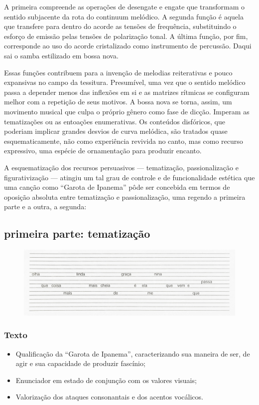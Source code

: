 A primeira compreende as operações de desengate e engate que transformam
o sentido subjacente da rota do continuum melódico. A segunda função é
aquela que transfere para dentro do acorde as tensões de frequência,
substituindo o esforço de emissão pelas tensões de polarização tonal. A
última função, por fim, corresponde ao uso do acorde cristalizado como
instrumento de percussão. Daqui sai o samba estilizado em bossa nova.

Essas funções contribuem para a invenção de melodias reiterativas e
pouco expansivas no campo da tessitura. Presumível, uma vez que o
sentido melódico passa a depender menos das inflexões em si e as
matrizes rítmicas se configuram melhor com a repetição de seus motivos.
A bossa nova se torna, assim, um movimento musical que culpa o próprio
gênero como fase de dicção. Imperam as tematizações ou as entoações
enumerativas. Os conteúdos disfóricos, que poderiam implicar grandes
desvios de curva melódica, são tratados quase esquematicamente, não como
experiência revivida no canto, mas como recurso expressivo, uma espécie
de ornamentação para produzir encanto.

A esquematização dos recursos persuasivos --- tematização, passionalização
e figurativização --- atingiu um tal grau de controle e de funcionalidade
estética que uma canção como ``Garota de Ipanema'' pôde ser concebida em
termos de oposição absoluta entre tematização e passionalização, uma
regendo a primeira parte e a outra, a segunda:

\subsection{primeira parte: tematização}

\begin{figure}[H]
\includegraphics[width=\textwidth]{./imgs/figura14.jpg}
\end{figure}

\subsubsection{Texto} 
\begin{itemize}
\item Qualificação da ``Garota de Ipanema'', caracterizando sua maneira de ser, de
agir e sua capacidade de produzir fascínio;
\item Enunciador em estado de conjunção com os valores visuais;
\item Valorização dos ataques consonantais e dos acentos vocálicos.
\end{itemize}

